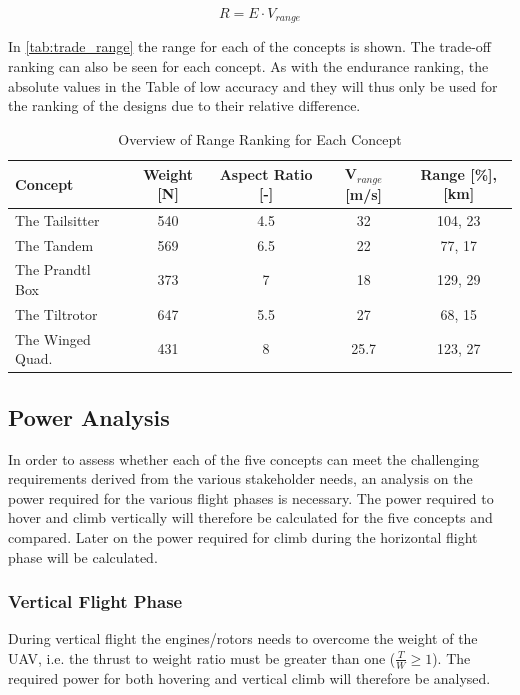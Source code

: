 \begin{equation}
    R = E\cdot V_{range}
    \label{eq:range}
\end{equation}

In \autoref{tab:trade_range} the range for each of the concepts is shown. The trade-off ranking can also be seen for each concept. As with the endurance ranking, the absolute values in the Table of low accuracy and they will thus only be used for the ranking of the designs due to their relative difference. 

\begin{table}[H]
    \centering
    \caption{Overview of Range Ranking for Each Concept}
    \label{tab:trade_range}
    \begin{adjustbox}{width=1\textwidth}
    \small
        \begin{tabular}{lcccc}
        \toprule
        \textbf{Concept} & \textbf{Weight [N]} & \textbf{Aspect Ratio [-]} & \textbf{V$_{range}$ [m/s] } &\textbf{Range [\%],[km]}  \\ \midrule
        The Tailsitter           &540 &4.5& 32  & 104, 23\\\hdashline
        The Tandem               &569 &6.5& 22   & 77, 17\\\hdashline
        The Prandtl Box          &373 &7 & 18 & 129, 29\\\hdashline
        The Tiltrotor            &647 &5.5  &27 & 68, 15\\\hdashline
        The Winged Quad.         &431 &8  &25.7 &123, 27 \\\bottomrule
        \end{tabular}
        \end{adjustbox}
\end{table}


\subsection{Power Analysis}
\label{sec:power_ana}

In order to assess whether each of the five concepts can meet the challenging requirements derived from the various stakeholder needs, an analysis on the power required for the various flight phases is necessary. The power required to hover and climb vertically will therefore be calculated for the five concepts and compared. Later on the power required for climb during the horizontal flight phase will be calculated.


\subsubsection{Vertical Flight Phase}
During vertical flight the engines/rotors needs to overcome the weight of the UAV, i.e. the thrust to weight ratio must be greater than one ($\frac{T}{W} \ge 1$). The required power for both hovering and vertical climb will therefore be analysed.

